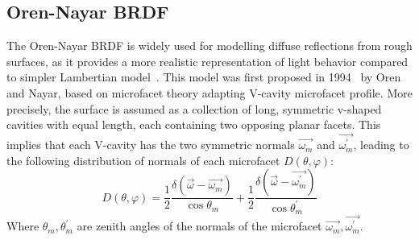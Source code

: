 \begin{itemize}
\end{itemize}

\subsection{Oren-Nayar BRDF}\label{subsec: oren-nayar-model}

The Oren-Nayar BRDF is widely used for modelling diffuse reflections from rough surfaces, as it provides a more realistic representation of light behavior compared to simpler Lambertian model~\cite{1995_Oren,2010_Roser}.
This model was first proposed in 1994~\cite{1995_Oren} by Oren and Nayar, based on microfacet theory adapting V-cavity microfacet profile.
More precisely, the surface is assumed as a collection of long, symmetric v-shaped cavities with equal length, each containing two opposing planar facets.
This implies that each V-cavity has the two symmetric normals $\overrightarrow{\omega_m}$ and $\overrightarrow{\omega_m^\prime}$, leading to the following distribution of normals of each microfacet $D(\theta, \varphi)$:
\[
    D(\theta, \varphi) = \frac{1}{2} \frac{\delta(\overrightarrow{\omega} - \overrightarrow{\omega_m})}{\cos \theta_m}%
    + \frac{1}{2} \frac{\delta(\overrightarrow{\omega} - \overrightarrow{\omega_m^\prime})}{\cos\theta_m^\prime}
\]
Where $\theta_m, \theta_m^\prime$ are zenith angles of the normals of the microfacet $\overrightarrow{\omega_m}, \overrightarrow{\omega_m^\prime}$.


